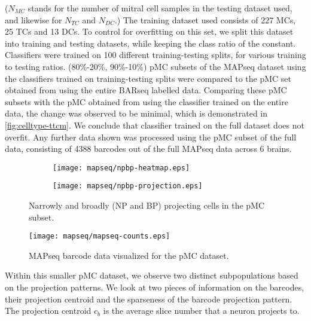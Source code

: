 \documentclass[../dissertation.tex]{subfiles}
\begin{document}
($N_{MC}$ stands for the number of mitral cell samples in the testing dataset used, and likewise for $N_{TC}$ and $N_{DC}$.)
The training dataset used consists of 227 MCs, 25 TCs and 13 DCs.
To control for overfitting on this set, we split this dataset into training and testing datasets, while keeping the class ratio of the  constant.
Classifiers were trained on 100 different training-testing splits, for various training to testing ratios. (80\%-20\%, 90\%-10\%)
pMC subsets of the MAPseq dataset using the classifiers trained on training-testing splits were compared to the pMC set obtained from using the entire BARseq labelled data.
Comparing these pMC subsets with the pMC obtained from using the classifier trained on the entire data, the change was observed to be minimal, which is demonstrated in \cref{fig:celltype-ttcm}.
We conclude that classifier trained on the full dataset does not overfit.
Any further data shown was processed using the pMC subset of the full data, consisting of 4388 barcodes out of the full MAPseq data across 6 brains.

\begin{figure}[ht!]
    \centering
    \begin{subfigure}[b]{0.45\textwidth}
        \texttt{[image: mapseq/npbp-heatmap.eps]}
        \label{fig:npbp-heatmap}
    \end{subfigure}
    \hfill
    \begin{subfigure}[b]{0.45\textwidth}
        \texttt{[image: mapseq/npbp-projection.eps]}
        \label{fig:npbp-proj}
    \end{subfigure}

    \caption{Narrowly and broadly (NP and BP) projecting cells in the pMC subset.}
    \label{fig:npbp}
\end{figure}

\begin{figure}[p!]
    \centering
    \texttt{[image: mapseq/mapseq-counts.eps]}
    \caption{MAPseq barcode data visualized for the pMC dataset.}
    \label{fig:obmapseqpmc}
\end{figure}


Within this smaller pMC dataset, we observe two distinct subpopulations based on the projection patterns.
We look at two pieces of information on the barcodes, their projection centroid and the sparseness of the barcode projection pattern.
The projection centroid $c_b$ is the average slice number that a neuron projects to.
\end{document}
